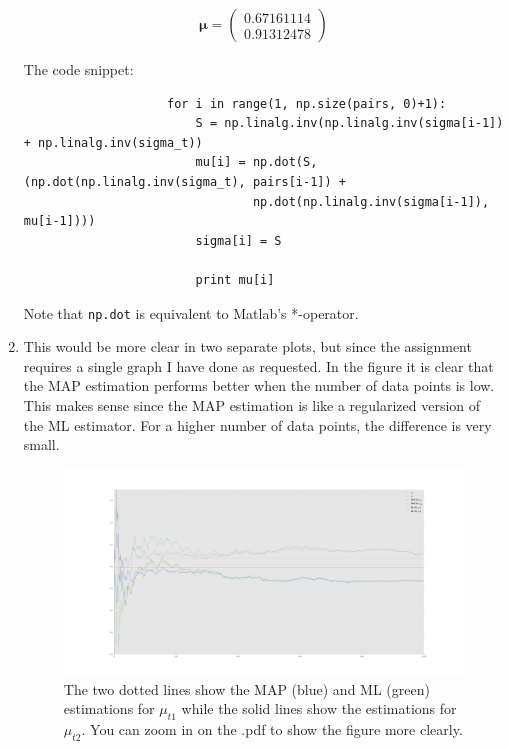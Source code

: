 \documentclass[paper=a4, fontsize=10pt]{scrartcl} %
\numberwithin{equation}{section} %
\numberwithin{figure}{section} %
\numberwithin{table}{section} %
\begin{document}
\begin{enumerate}
			\begin{align}
				\boldsymbol\mu = \begin{pmatrix} 0.67161114 \\ 0.91312478 \end{pmatrix}
			\end{align}

			The code snippet:

			\begin{verbatim}
					for i in range(1, np.size(pairs, 0)+1):
					    S = np.linalg.inv(np.linalg.inv(sigma[i-1]) + np.linalg.inv(sigma_t))
					    mu[i] = np.dot(S, (np.dot(np.linalg.inv(sigma_t), pairs[i-1]) +
					            np.dot(np.linalg.inv(sigma[i-1]), mu[i-1])))
					    sigma[i] = S

					    print mu[i]
			\end{verbatim}

			Note that \verb|np.dot| is equivalent to Matlab's *-operator.
	\item This would be more clear in two separate plots, but since the assignment requires a single graph I have done as requested.
		  In the figure it is clear that the MAP estimation performs better when the number of data points is low. This makes sense since the MAP estimation is like a regularized version of the ML estimator. For a higher number of data points, the difference is very small.

			\begin{figure}[h!]
				\centering
				\hspace*{-10em}\includegraphics[width=1.3\textwidth]{exercise_134.png}
				\caption{The two dotted lines show the MAP (blue) and ML (green) estimations for $\mu_{t1}$ while the solid lines show the estimations for $\mu_{t2}$. You can zoom in on the .pdf to show the figure more clearly.}
			\end{figure}
\end{enumerate}
\end{document}
